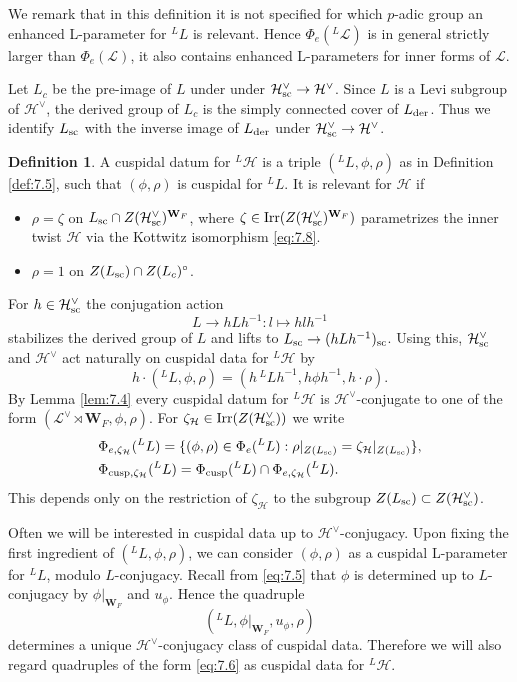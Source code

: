 \documentclass[11pt]{amsart}
\theoremstyle{definition}
\newtheorem{defn}[thm]{Definition}
\newcommand{\mb}{\mathbf}
\def\Irr{{\rm Irr}}
\def\cL{{\mathcal L}}
\def\cH{{\mathcal H}}
\def\der{{\rm der}}
\def\sc{{\rm sc}}
\def\cusp{{\rm cusp}}
\begin{document}
We remark that in this definition it is not specified for which $p$-adic group
an enhanced L-parameter for ${}^L L$ is relevant. Hence $\Phi_e ({}^L \cL)$ is in
general strictly larger than $\Phi_e (\cL)$, it also contains enhanced L-parameters
for inner forms of $\cL$.

Let $L_c$ be the pre-image of $L$ under under $\cH^\vee_\sc \to \cH^\vee$.
Since $L$ is a Levi subgroup of $\cH^\vee$, the derived group of $L_c$ is the simply
connected cover of $L_\der$. Thus we identify $L_{\sc}$ with the inverse image of $L_\der$ 
under $\cH^\vee_{\sc} \to \cH^\vee$. 

\begin{defn}\label{defn:cuspdat}
A cuspidal datum for ${}^L \cH$ is a triple $({}^L L,\phi,\rho)$ as in Definition 
\ref{def:7.5}, such that $(\phi,\rho)$ is cuspidal for ${}^L L$.
It is relevant for $\cH$ if 
\begin{itemize}
\item $\rho = \zeta$ on $L_\sc \cap Z(\cH^\vee_\sc)^{\mb W_F}$, where 
$\zeta \in \Irr (Z(\cH^\vee_\sc)^{\mb W_F})$ parametrizes the inner twist $\cH$ via 
the Kottwitz isomorphism \eqref{eq:7.8}.
\item $\rho = 1$ on $Z(L_\sc) \cap Z(L_c)^\circ$.
\end{itemize}
\end{defn}

For $h \in \cH^\vee_{\sc}$ the conjugation action 
\[
L \to h L h^{-1} : l \mapsto h l h^{-1} 
\]
stabilizes the derived group of $L$ and lifts to $L_{\sc} \to (h L h^{-1})_{\sc}$.
Using this, $\cH^\vee_{\sc}$ and $\cH^\vee$ act naturally on cuspidal data for 
${}^L \cH$ by
\[
h \cdot ({}^L L, \phi, \rho) = (h \, {}^L L h^{-1}, h \phi h^{-1}, h \cdot \rho) . 
\]
By Lemma \ref{lem:7.4} every cuspidal datum for ${}^L \cH$ is $\cH^\vee$-conjugate 
to one of the form $(\cL^\vee \rtimes \mb W_F , \phi, \rho)$. 
For $\zeta_{\cH} \in \Irr (Z(\cH^\vee_\sc))$ we write
\begin{align*}
& \Phi_{e,\zeta_\cH}({}^L L) = \{ (\phi,\rho) \in \Phi_e ({}^L L) :
\rho |_{Z(L_\sc)} = \zeta_\cH |_{Z(L_\sc)} \} , \\
& \Phi_{\cusp,\zeta_\cH}({}^L L) = \Phi_\cusp ({}^L L) \cap \Phi_{e,\zeta_\cH}({}^L L) .
\end{align*}
This depends only on the restriction of $\zeta_\cH$ to the subgroup
$Z(L_\sc) \subset Z(\cH^\vee_\sc)$.

Often we will be interested in cuspidal data up to $\cH^\vee$-conjugacy.
Upon fixing the first ingredient of $({}^L L, \phi, \rho)$, we can consider 
$(\phi,\rho)$ as a cuspidal L-parameter for ${}^L L$, modulo $L$-conjugacy.
Recall from \eqref{eq:7.5} that $\phi$ is determined up to $L$-conjugacy
by $\phi |_{\mb W_F}$ and $u_\phi$. Hence the quadruple
\begin{equation}\label{eq:7.6}
({}^L L, \phi |_{\mb W_F}, u_\phi, \rho)
\end{equation}
determines a unique $\cH^\vee$-conjugacy class of cuspidal data. 
Therefore we will also regard quadruples of the form \eqref{eq:7.6} as cuspidal
data for ${}^L \cH$.
\end{document}
